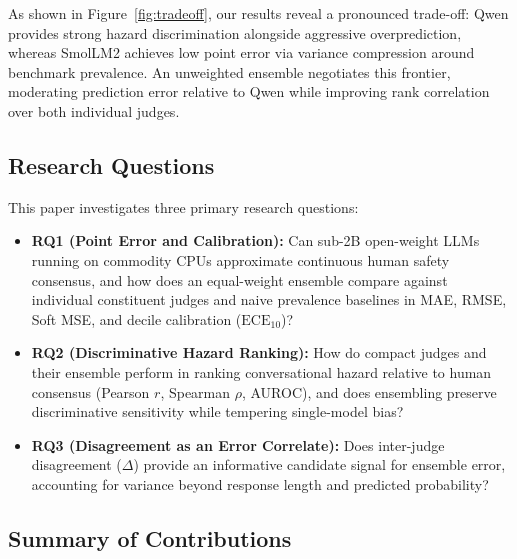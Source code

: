 As shown in Figure~\ref{fig:tradeoff}, our results reveal a pronounced trade-off: Qwen provides strong hazard discrimination alongside aggressive overprediction, whereas SmolLM2 achieves low point error via variance compression around benchmark prevalence. An unweighted ensemble negotiates this frontier, moderating prediction error relative to Qwen while improving rank correlation over both individual judges.

\subsection{Research Questions}
\label{sec:rqs}

This paper investigates three primary research questions:
\begin{itemize}
    \item \textbf{RQ1 (Point Error and Calibration):} Can sub-2B open-weight LLMs running on commodity CPUs approximate continuous human safety consensus, and how does an equal-weight ensemble compare against individual constituent judges and naive prevalence baselines in MAE, RMSE, Soft MSE, and decile calibration ($\text{ECE}_{10}$)?
    \item \textbf{RQ2 (Discriminative Hazard Ranking):} How do compact judges and their ensemble perform in ranking conversational hazard relative to human consensus (Pearson $r$, Spearman $\rho$, AUROC), and does ensembling preserve discriminative sensitivity while tempering single-model bias?
    \item \textbf{RQ3 (Disagreement as an Error Correlate):} Does inter-judge disagreement ($\Delta$) provide an informative candidate signal for ensemble error, accounting for variance beyond response length and predicted probability?
\end{itemize}

\subsection{Summary of Contributions}
\label{sec:contributions}

